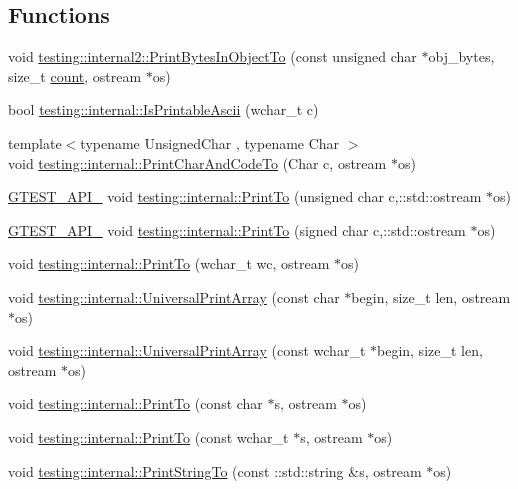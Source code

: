 \subsection*{Functions}
\begin{DoxyCompactItemize}
\item 
void \hyperlink{namespacetesting_1_1internal2_abfb9aa80365f93b952e9a4bea09947a8}{testing\+::internal2\+::\+Print\+Bytes\+In\+Object\+To} (const unsigned char $\ast$obj\+\_\+bytes, size\+\_\+t \hyperlink{gmock__stress__test_8cc_afd9db40e3361ae09188795e8cbe19752}{count}, ostream $\ast$os)
\item 
bool \hyperlink{namespacetesting_1_1internal_a744a6dd74c12d1e2c16b3c03e14ed4d4}{testing\+::internal\+::\+Is\+Printable\+Ascii} (wchar\+\_\+t c)
\item 
{\footnotesize template$<$typename Unsigned\+Char , typename Char $>$ }\\void \hyperlink{namespacetesting_1_1internal_a0c577e598e61d339ba45dd6643fb1969}{testing\+::internal\+::\+Print\+Char\+And\+Code\+To} (Char c, ostream $\ast$os)
\item 
\hyperlink{gtest-port_8h_aa73be6f0ba4a7456180a94904ce17790}{G\+T\+E\+S\+T\+\_\+\+A\+P\+I\+\_\+} void \hyperlink{namespacetesting_1_1internal_abae1a8d465376b68576918205ad706a9}{testing\+::internal\+::\+Print\+To} (unsigned char c,\+::std\+::ostream $\ast$os)
\item 
\hyperlink{gtest-port_8h_aa73be6f0ba4a7456180a94904ce17790}{G\+T\+E\+S\+T\+\_\+\+A\+P\+I\+\_\+} void \hyperlink{namespacetesting_1_1internal_a09f551128c4d165c37004e36ccc87aa0}{testing\+::internal\+::\+Print\+To} (signed char c,\+::std\+::ostream $\ast$os)
\item 
void \hyperlink{namespacetesting_1_1internal_aa74ea9d64f76ce69eceb225ca5ebef58}{testing\+::internal\+::\+Print\+To} (wchar\+\_\+t wc, ostream $\ast$os)
\item 
void \hyperlink{namespacetesting_1_1internal_a070107e7a8205ad6ec4d538d52b15b38}{testing\+::internal\+::\+Universal\+Print\+Array} (const char $\ast$begin, size\+\_\+t len, ostream $\ast$os)
\item 
void \hyperlink{namespacetesting_1_1internal_a52394019018eb5079f9f1bcca23dcd60}{testing\+::internal\+::\+Universal\+Print\+Array} (const wchar\+\_\+t $\ast$begin, size\+\_\+t len, ostream $\ast$os)
\item 
void \hyperlink{namespacetesting_1_1internal_adc6c98306d40b53fd07be4e295102a0a}{testing\+::internal\+::\+Print\+To} (const char $\ast$s, ostream $\ast$os)
\item 
void \hyperlink{namespacetesting_1_1internal_afc20fb56b2547a8f91f9ff99650f2024}{testing\+::internal\+::\+Print\+To} (const wchar\+\_\+t $\ast$s, ostream $\ast$os)
\item 
void \hyperlink{namespacetesting_1_1internal_ad609167d8d6792b0fb186539e0e159bd}{testing\+::internal\+::\+Print\+String\+To} (const \+::std\+::string \&s, ostream $\ast$os)
\end{DoxyCompactItemize}
